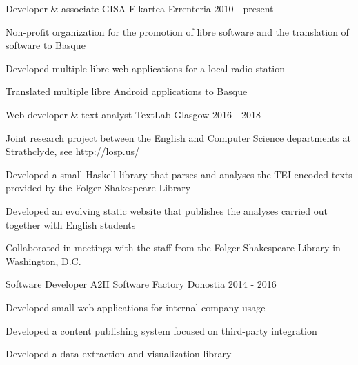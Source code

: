 \documentclass[11pt, a4paper]{awesome-cv}
\begin{document}
\begin{cventries}

    \cventry
      {Developer \& associate} %
      {GISA Elkartea} %
      {Errenteria} %
      {2010 - present} %
      {
        \begin{cvitems} %
          \item {Non-profit organization for the promotion of libre software and
              the translation of software to Basque}
          \item {Developed multiple libre web applications for a local radio
              station}
          \item {Translated multiple libre Android applications to Basque}
        \end{cvitems}
      }

    \cventry
      {Web developer \& text analyst} %
      {TextLab} %
      {Glasgow} %
      {2016 - 2018} %
      {
        \begin{cvitems} %
          \item {Joint research project between the English and Computer Science
              departments at Strathclyde, see \url{http://losp.us/}}
          \item {Developed a small Haskell library that parses and analyses the
              TEI-encoded texts provided by the Folger Shakespeare Library}
          \item {Developed an evolving static website that publishes the
              analyses carried out together with English students}
          \item {Collaborated in meetings with the staff from the Folger
              Shakespeare Library in Washington, D.C.}
        \end{cvitems}
      }

    \cventry
      {Software Developer} %
      {A2H Software Factory} %
      {Donostia} %
      {2014 - 2016} %
      {
        \begin{cvitems} %
          \item {Developed small web applications for internal company usage}
          \item {Developed a content publishing system focused on third-party
              integration}
          \item {Developed a data extraction and visualization library}
        \end{cvitems}
      }


\end{cventries}
\end{document}
